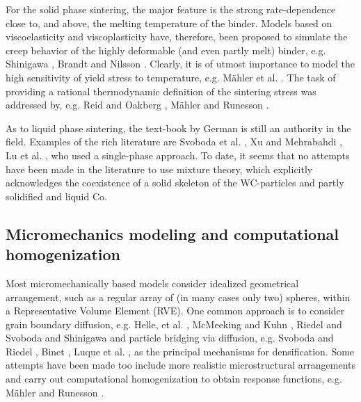 \documentclass[ExampleMasters.tex]{subfiles}
\begin{document}
For the solid phase sintering, the major feature is the strong rate-dependence close to, and above, the melting temperature of the binder.
Models based on viscoelasticity and viscoplasticity have, therefore, been proposed to simulate the creep behavior of the highly deformable (and even partly melt) binder, e.g. Shinigawa \cite{Shi1996}, Brandt and Nilsson \cite{BraNil1998}.
Clearly, it is of utmost importance to model the high sensitivity of yield stress to temperature, e.g. Mähler et al. \cite{MahEkhRun2001a}.
The task of providing a rational thermodynamic definition of the sintering stress was addressed by, e.g. Reid and Oakberg \cite{ReiOak1990}, Mähler and Runesson \cite{MahRun2000}.

As to liquid phase sintering, the text-book by German \cite{Ger1985} is still an authority in the field.
Examples of the rich literature are Svoboda et al. \cite{SvoRieGae1996}, Xu and Mehrabahdi \cite{XuMeh1997}, Lu et al. \cite{LuXuYiGer2001}, who used a single-phase approach.
To date, it seems that no attempts have been made in the literature to use mixture theory, which explicitly acknowledges the coexistence of a solid skeleton of the WC-particles and partly solidified and liquid Co.

\subsection{Micromechanics modeling and computational homogenization}

Most micromechanically based models consider idealized geometrical arrangement, such as a regular array of (in many cases only two) spheres, within a Representative Volume Element (RVE).
One common approach is to consider grain boundary diffusion, e.g. Helle, et al. \cite{HelEasAsh1985}, McMeeking and Kuhn \cite{McMKuh1992}, Riedel and Svoboda \cite{RieSvo1993} and Shinigawa \cite{Shi1996} and particle bridging via diffusion, e.g. Svoboda and Riedel \cite{SvoRie1995}, Binet \cite{BinLenHeaGer2004}, Luque et al. \cite{LuqAldMarMarSevFar2005}, as the principal mechanisms for densification.
Some attempts have been made too include more realistic microstructural arrangements and carry out computational homogenization to obtain response functions, e.g. Mähler and Runesson \cite{MahRun2000}.
\end{document}
